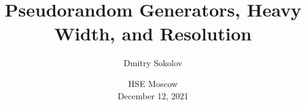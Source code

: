 

\titlegraphic{
    
}


\title[]{
    Pseudorandom Generators, Heavy Width, and Resolution
}

\author{
    Dmitry Sokolov
}  


\date{HSE Moscow\\ December 12, 2021}

\newcommand{\SPCR}{\PrSys{S}\text{-}\PrSys{PCR}}
\newcommand{\SSOS}{\PrSys{S}\text{-}\PrSys{SOS}}




    \maketitle

    
    
    
    

